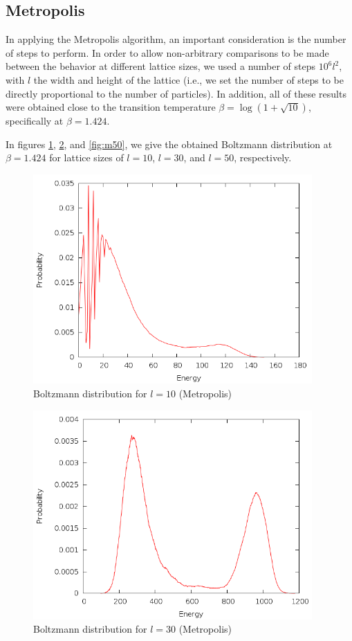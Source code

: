 \documentclass{article}
\begin{document}
\subsection{Metropolis}
\label{sec:metropolis}
In applying the Metropolis algorithm, an important consideration is the number of steps to perform.
In order to allow non-arbitrary comparisons to be made between the behavior at different lattice sizes, we used a number of steps $10^6l^2$, with $l$ the width and height of the lattice (i.e., we set the number of steps to be directly proportional to the number of particles).
In addition, all of these results were obtained close to the transition temperature $\beta = \log(1+\sqrt{10})$, specifically at $\beta = 1.424$.

In figures \ref{fig:m10}, \ref{fig:m30}, and \ref{fig:m50}, we give the obtained Boltzmann distribution at $\beta = 1.424$ for lattice sizes of $l = 10$, $l = 30$, and $l = 50$, respectively.

\begin{figure}[h]
\includegraphics[height=8cm]{../results/metropolis/m10.png}
\caption{Boltzmann distribution for $l = 10$ (Metropolis)}
\label{fig:m10}
\end{figure}

\begin{figure}[h]
\includegraphics[height=8cm]{../results/metropolis/m30.png}
\caption{Boltzmann distribution for $l = 30$ (Metropolis)}
\label{fig:m30}
\end{figure}
\end{document}
